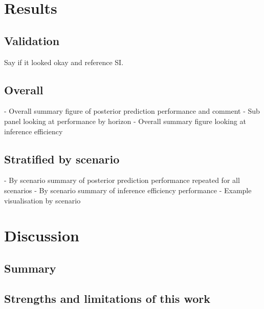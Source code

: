 \documentclass{getwriting}
\begin{document}
\section{Results}\label{results}

\subsection{Validation}

Say if it looked okay and reference SI.

\subsection{Overall}

- Overall summary figure of posterior prediction performance and comment
- Sub panel looking at performance by horizon
- Overall summary figure looking at inference efficiency

\subsection{Stratified by scenario}

- By scenario summary of posterior prediction performance repeated for all scenarios
- By scenario summary of inference efficiency performance
- Example visualisation by scenario

\section{Discussion}

\subsection{Summary}

\subsection{Strengths and limitations of this work}
\end{document}
